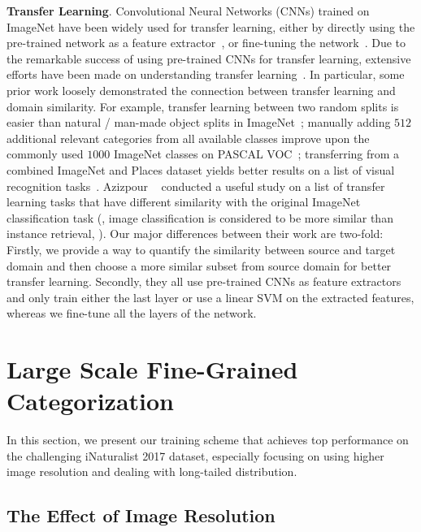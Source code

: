 \documentclass[10pt,twocolumn,letterpaper]{article}
\begin{document}
\textbf{Transfer Learning}.
Convolutional Neural Networks (CNNs) trained on ImageNet have been widely used for transfer learning, either by directly using the pre-trained network as a feature extractor~\cite{cnn_off_the_shelf, decaf, places}, or fine-tuning the network~\cite{rcnn, transfer_cvpr14}.
Due to the remarkable success of using pre-trained CNNs for transfer learning, extensive efforts have been made on understanding transfer learning~\cite{how_transferable, azizpour2016factors, what_makes_imagenet_transfer, revisiting_data}.
In particular, some prior work loosely demonstrated the connection between transfer learning and domain similarity.
For example, transfer learning between two random splits is easier than natural / man-made object splits in ImageNet~\cite{how_transferable}; manually adding $512$ additional relevant categories from all available classes improve upon the commonly used $1000$ ImageNet classes on PASCAL VOC~\cite{voc}; transferring from a combined ImageNet and Places dataset yields better results on a list of visual recognition tasks~\cite{places}.
Azizpour \etal~\cite{azizpour2016factors} conducted a useful study on a list of transfer learning tasks that have different similarity with the original ImageNet classification task (\eg, image classification is considered to be more similar than instance retrieval, \etc).
Our major differences between their work are two-fold:
Firstly, we provide a way to quantify the similarity between source and target domain and then choose a more similar subset from source domain for better transfer learning.
Secondly, they all use pre-trained CNNs as feature extractors and only train either the last layer or use a linear SVM on the extracted features, whereas we fine-tune all the layers of the network.






\section{Large Scale Fine-Grained Categorization}
\label{sec:lsfgvc}

In this section, we present our training scheme that achieves top performance on the challenging iNaturalist 2017 dataset, especially focusing on using higher image resolution and dealing with long-tailed distribution.


\subsection{The Effect of Image Resolution}
\label{sec:image_resolution}
\end{document}

